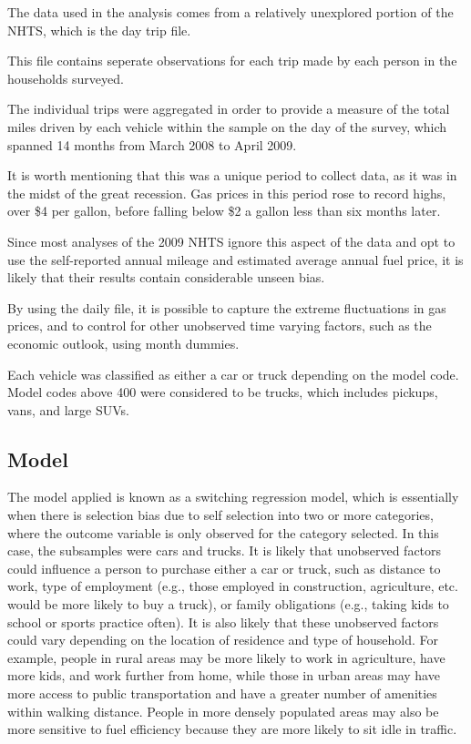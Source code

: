 \documentclass{article}
\begin{document}
The data used in the analysis comes from a relatively unexplored portion of the NHTS, which is the day trip file.

  This file contains seperate observations for each trip made by each person in the households surveyed.  

The individual trips were aggregated in order to provide a measure of the total miles driven by each vehicle within the sample on the day of the survey, which spanned 14 months from March 2008 to April 2009.  

It is worth mentioning that this was a unique period to collect data, as it was in the midst of the great recession.  Gas prices in this period rose to record highs, over \$4 per gallon, before falling below \$2 a gallon less than six months later.  

Since most analyses of the 2009 NHTS ignore this aspect of the data and opt to use the self-reported annual mileage and estimated average annual fuel price, it is likely that their results contain considerable unseen bias.  

By using the daily file, it is possible to capture the extreme fluctuations in gas prices, and to control for other unobserved time varying factors, such as the economic outlook, using month dummies.

Each vehicle was classified as either a car or truck depending on the model code.  Model codes above 400 were considered to be trucks, which includes pickups, vans, and large SUVs.

\subsection{Model}

The model applied is known as a switching regression model, which is essentially when there is selection bias due to self selection into two or more categories, where the outcome variable is only observed for the category selected.  In this case, the subsamples were cars and trucks.  It is likely that unobserved factors could influence a person to purchase either a car or truck, such as distance to work, type of employment (e.g., those employed in construction, agriculture, etc. would be more likely to buy a truck), or family obligations (e.g., taking kids to school or sports practice often).  It is also likely that these unobserved factors could vary depending on the location of residence and type of household.  For example, people in rural areas may be more likely to work in agriculture, have more kids, and work further from home, while those in urban areas may have more access to public transportation and have a greater number of amenities within walking distance.  People in more densely populated areas may also be more sensitive to fuel efficiency because they are more likely to sit idle in traffic.
\end{document}
